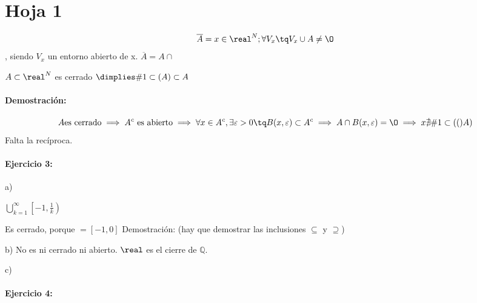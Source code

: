 \documentclass[a4paper,10pt]{apuntes}
\title{}
\author{}
\date{}
\newcommand{\ejer}[1]{\paragraph{Ejercicio #1:}}
\newcommand{\acum}[1]{\#1 \subset(#1) }
\newcommand{\dem}{\paragraph{Demostración:}}
\begin{document}
\section{Hoja 1}

$$\overline{A} = { x \in \real^N; \forall V_x \tq V_x \cup A \neq \text{\O}}$$, siendo $V_x$ un entorno abierto de x.
	$\overline{A} = A \cap $ 
	
\begin{theorem}
$A \subset \real^N$ es cerrado $\dimplies \acum{A}\subset A$ 
\end{theorem}

 

\dem{}
$$A \text{es cerrado} \implies A^c \text{ es abierto} \implies \forall x \in A^c, \exists \varepsilon > 0 \tq B(x,\varepsilon) \subset A^c \implies A \cap B(x,\varepsilon) = \O \implies x \nexists \acum(A)$$
Falta la recíproca.
\ejer{3}

a)

$\displaystyle\bigcup_{k=1}^{\infty} \left[-1,\frac{1}{k}\right)$

Es cerrado, porque $=[-1,0]$
Demostración: (hay que demostrar las inclusiones $\subseteq$ y $\supseteq$)

b)
No es ni cerrado ni abierto.
\obs $\real$ es el cierre de $\mathbb{Q}$.

c)
\ejer{4}
\end{document}
